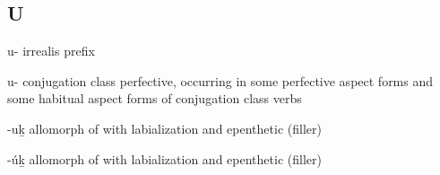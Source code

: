 
\subsection{U}\label{sec:alphalist-u}
\begin{morphdesc}[resume*=alphalist]
\item[u-]\label{m:u-irr}
	irrealis prefix

\item[u-]\label{m:u-pfv}
	 conjugation class perfective,
	occurring in some perfective aspect forms and some habitual aspect forms of
	 conjugation class verbs

\item[-uḵ]\label{m:-uḵ}
	allomorph of  with labialization and epenthetic (filler) 

\item[-úḵ]\label{m:-úḵ}
	allomorph of  with labialization and epenthetic (filler) 


\end{morphdesc}
